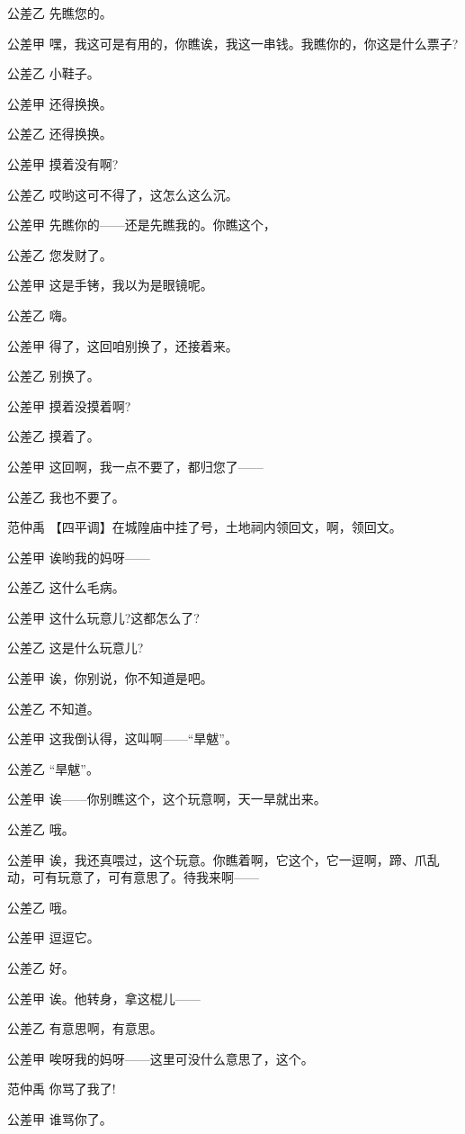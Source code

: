 公差乙 先瞧您的。

公差甲 嘿，我这可是有用的，你瞧诶，我这一串钱。我瞧你的，你这是什么票子?

公差乙 小鞋子。

公差甲 还得换换。

公差乙 还得换换。

公差甲 摸着没有啊?

公差乙 哎哟这可不得了，这怎么这么沉。

公差甲 先瞧你的------还是先瞧我的。你瞧这个，

公差乙 您发财了。

公差甲 这是手铐，我以为是眼镜呢。

公差乙 嗨。

公差甲 得了，这回咱别换了，还接着来。

公差乙 别换了。

公差甲 摸着没摸着啊?

公差乙 摸着了。

公差甲 这回啊，我一点不要了，都归您了------

公差乙 我也不要了。

范仲禹 【四平调】在城隍庙中挂了号，土地祠内领回文，啊，领回文。

公差甲 诶哟我的妈呀------

公差乙 这什么毛病。

公差甲 这什么玩意儿?这都怎么了?

公差乙 这是什么玩意儿?

公差甲 诶，你别说，你不知道是吧。

公差乙 不知道。

公差甲 这我倒认得，这叫啊------``旱魃''。

公差乙 ``旱魃''。

公差甲 诶------你别瞧这个，这个玩意啊，天一旱就出来。

公差乙 哦。

公差甲
诶，我还真喂过，这个玩意。你瞧着啊，它这个，它一逗啊，蹄、爪乱动，可有玩意了，可有意思了。待我来啊------

公差乙 哦。

公差甲 逗逗它。

公差乙 好。

公差甲 诶。他转身，拿这棍儿------

公差乙 有意思啊，有意思。

公差甲 唉呀我的妈呀------这里可没什么意思了，这个。

范仲禹 你骂了我了!

公差甲 谁骂你了。

